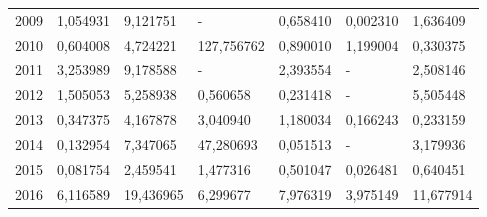\begin{table}
\begin{tabular}{p{1cm}p{2cm}p{2cm}p{2cm}p{2cm}p{2cm}p{2cm}}
 2009 &                                     1,054931 &                        9,121751 &            - &                         0,658410 &                       0,002310 &                                     1,636409 \\
 2010 &                                     0,604008 &                        4,724221 &   127,756762 &                         0,890010 &                       1,199004 &                                     0,330375 \\
 2011 &                                     3,253989 &                        9,178588 &            - &                         2,393554 &                              - &                                     2,508146 \\
 2012 &                                     1,505053 &                        5,258938 &     0,560658 &                         0,231418 &                              - &                                     5,505448 \\
 2013 &                                     0,347375 &                        4,167878 &     3,040940 &                         1,180034 &                       0,166243 &                                     0,233159 \\
 2014 &                                     0,132954 &                        7,347065 &    47,280693 &                         0,051513 &                              - &                                     3,179936 \\
 2015 &                                     0,081754 &                        2,459541 &     1,477316 &                         0,501047 &                       0,026481 &                                     0,640451 \\
 2016 &                                     6,116589 &                       19,436965 &     6,299677 &                         7,976319 &                       3,975149 &                                    11,677914 \\
\bottomrule
\end{tabular}
\end{table}
